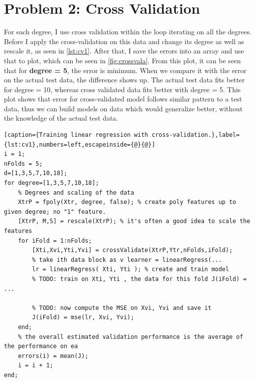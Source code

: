 \documentclass[a4paper, 11pt]{article}
\begin{document}
\section*{Problem 2: Cross Validation}
\vspace{-10pt}
For each degree, I use cross validation within the loop iterating on all the degrees. Before I apply the cross-validation on this data and change its degree as well as rescale it, as seen in \autoref{lst:cv1}. After that, I  save the errors into an array and use that to plot, which can be seen in \autoref{fig:crossvala}. From this plot, it can be seen that for \textbf{degree = 5}, the error is minimum. When we compare it with the error on the actual test data, the difference shows up. The actual test data fits better for degree = 10, whereas cross validated data fits better with degree = 5. This plot shows that error for cross-validated model follows similar pattern to a test data, thus we can build models on data which would generalize better, without the knowledge of the actual test data.
\vspace{-15pt}
\begin{lstlisting}[caption={Training linear regression with cross-validation.},label={lst:cv1},numbers=left,escapeinside={@}{@}]
i = 1;
nFolds = 5;
d=[1,3,5,7,10,18];
for degree=[1,3,5,7,10,18];
    % Degrees and scaling of the data
    XtrP = fpoly(Xtr, degree, false); % create poly features up to given degree; no "1" feature.
    [XtrP, M,S] = rescale(XtrP); % it's often a good idea to scale the features 
    for iFold = 1:nFolds;
        [Xti,Xvi,Yti,Yvi] = crossValidate(XtrP,Ytr,nFolds,iFold);
        % take ith data block as v learner = linearRegress(... 
        lr = linearRegress( Xti, Yti ); % create and train model
        % TODO: train on Xti, Yti , the data for this fold J(iFold) = ... 
        
        % TODO: now compute the MSE on Xvi, Yvi and save it 
        J(iFold) = mse(lr, Xvi, Yvi);
    end;
    % the overall estimated validation performance is the average of the performance on ea
    errors(i) = mean(J);
    i = i + 1;
end;
\end{lstlisting}
\end{document}
